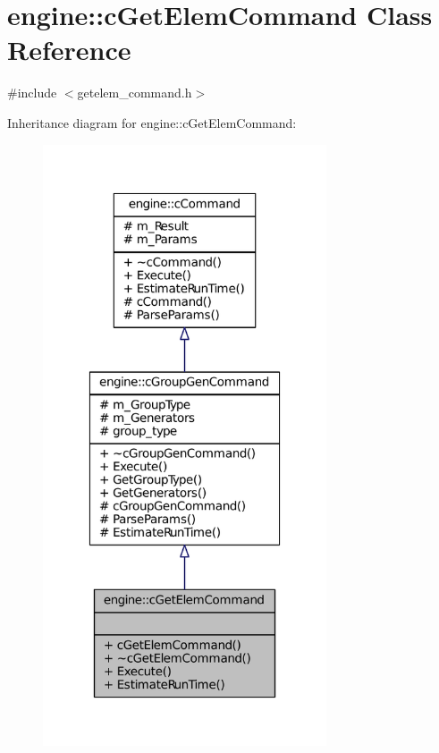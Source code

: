 \hypertarget{classengine_1_1cGetElemCommand}{\section{engine\-:\-:c\-Get\-Elem\-Command \-Class \-Reference}
\label{classengine_1_1cGetElemCommand}
}


{\ttfamily \#include $<$getelem\-\_\-command.\-h$>$}



\-Inheritance diagram for engine\-:\-:c\-Get\-Elem\-Command\-:
\nopagebreak
\begin{figure}[H]
\begin{center}
\leavevmode
\includegraphics[width=238pt]{classengine_1_1cGetElemCommand__inherit__graph}
\end{center}
\end{figure}



